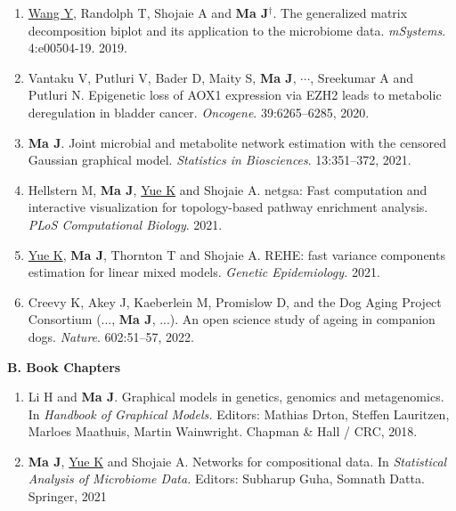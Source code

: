 \documentclass[10pt]{article}
\begin{document}
\begin{enumerate}
 \item \underline{Wang Y}, Randolph T, Shojaie A and \textbf{Ma J}{$^{\dagger}$}. The generalized matrix decomposition biplot and its application to the microbiome data. {\em mSystems}. 4:e00504-19. 2019.
 \item Vantaku V, Putluri V, Bader D, Maity S, \textbf{Ma J}, $\cdots$, Sreekumar A and Putluri N. Epigenetic loss of AOX1 expression via EZH2 leads to metabolic deregulation in bladder cancer. {\em Oncogene}. 39:6265--6285, 2020.   
 \item \textbf{Ma J}. Joint microbial and metabolite network estimation with the censored Gaussian graphical model. {\em Statistics in Biosciences}. 13:351--372, 2021.
\item Hellstern M, \textbf{Ma J}, \underline{Yue K} and Shojaie A. netgsa: Fast computation and interactive visualization for topology-based pathway enrichment analysis. {\it PLoS Computational Biology}. 2021.
\item \underline{Yue K}, \textbf{Ma J}, Thornton T and Shojaie A. REHE: fast variance components estimation for linear mixed models. {\it Genetic Epidemiology.} 2021. 
\item Creevy K, Akey J, Kaeberlein M, Promislow D, and the Dog Aging Project Consortium (..., \textbf{Ma J}, ...). An open science study of ageing in companion dogs. {\it Nature}. 602:51--57, 2022.
\end{enumerate}

\textbf{B. Book Chapters}
\begin{enumerate}
\item Li H and \textbf{Ma J}. Graphical models in genetics, genomics and metagenomics. In {\em Handbook of Graphical Models.} Editors: Mathias Drton, Steffen Lauritzen, Marloes Maathuis, Martin Wainwright. Chapman \& Hall / CRC, 2018.
\item \textbf{Ma J}, \underline{Yue K} and Shojaie A. Networks for compositional data. In \emph{Statistical Analysis of Microbiome Data.} Editors: Subharup Guha, Somnath Datta. Springer, 2021
\end{enumerate}
\end{document}
